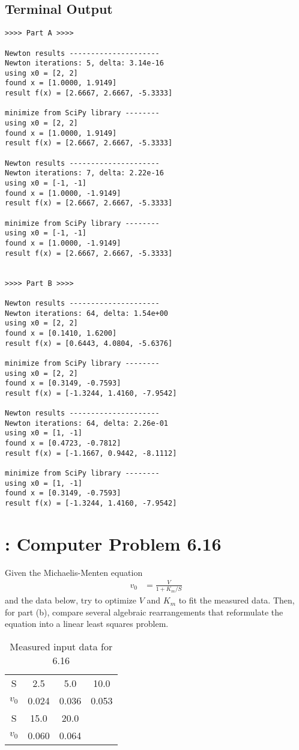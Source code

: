 \documentclass[paper=a4, fontsize=11pt]{scrartcl}
\numberwithin{equation}{section}		%
\numberwithin{figure}{section}			%
\numberwithin{table}{section}				%
\begin{document}
\vspace{4mm}
\subsection{Terminal Output}
\begin{verbatim}
>>>> Part A >>>>

Newton results ---------------------
Newton iterations: 5, delta: 3.14e-16
using x0 = [2, 2]
found x = [1.0000, 1.9149]
result f(x) = [2.6667, 2.6667, -5.3333]

minimize from SciPy library --------
using x0 = [2, 2]
found x = [1.0000, 1.9149]
result f(x) = [2.6667, 2.6667, -5.3333]

Newton results ---------------------
Newton iterations: 7, delta: 2.22e-16
using x0 = [-1, -1]
found x = [1.0000, -1.9149]
result f(x) = [2.6667, 2.6667, -5.3333]

minimize from SciPy library --------
using x0 = [-1, -1]
found x = [1.0000, -1.9149]
result f(x) = [2.6667, 2.6667, -5.3333]


>>>> Part B >>>>

Newton results ---------------------
Newton iterations: 64, delta: 1.54e+00
using x0 = [2, 2]
found x = [0.1410, 1.6200]
result f(x) = [0.6443, 4.0804, -5.6376]

minimize from SciPy library --------
using x0 = [2, 2]
found x = [0.3149, -0.7593]
result f(x) = [-1.3244, 1.4160, -7.9542]

Newton results ---------------------
Newton iterations: 64, delta: 2.26e-01
using x0 = [1, -1]
found x = [0.4723, -0.7812]
result f(x) = [-1.1667, 0.9442, -8.1112]

minimize from SciPy library --------
using x0 = [1, -1]
found x = [0.3149, -0.7593]
result f(x) = [-1.3244, 1.4160, -7.9542]
\end{verbatim}


\vspace{4mm}
\section{: Computer Problem 6.16}
Given the Michaelis-Menten equation
\begin{align*}
	v_0 &= \frac{V}{1 + K_m/S}
\end{align*}
and the data below, try to optimize $V$ and $K_m$ to fit the measured data. Then, for part (b), compare several algebraic rearrangements that reformulate the equation into a linear least squares problem.
\begin{table}[!hbt]
	\begin{center}
		\caption{Measured input data for 6.16}
		\label{tab:6.16input}
		\begin{tabular}{ c|c c c }
			S & 2.5 & 5.0 & 10.0\\
			$v_0$ & 0.024 & 0.036 & 0.053 \\
			\hline
			S & 15.0 & 20.0 & \\
			$v_0$ & 0.060 & 0.064 & \\
		\end{tabular}
	\end{center}
\end{table}
\end{document}
